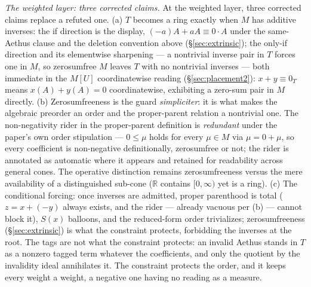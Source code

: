 \textit{The weighted layer: three corrected claims.} At the weighted layer, three corrected claims replace a refuted one. (a) $T$ becomes a ring exactly when $M$ has additive inverses: the if direction is the display, $(-a)A + aA \equiv 0 \cdot A$ under the same-Aethus clause and the deletion convention above (§\ref{sec:extrinsic}); the only-if direction and its elementwise sharpening --- a nontrivial inverse pair in $T$ forces one in $M$, so zerosumfree $M$ leaves $T$ with no nontrivial inverses --- both immediate in the $M[U]$ coordinatewise reading (§\ref{sec:placement2}): $x + y \equiv 0_T$ means $x(A) + y(A) = 0$ coordinatewise, exhibiting a zero-sum pair in $M$ directly. (b) Zerosumfreeness is the guard \emph{simpliciter}: it is what makes the algebraic preorder an order and the proper-parent relation a nontrivial one. The non-negativity rider in the proper-parent definition is \emph{redundant} under the paper's own order stipulation --- $0 \leq \mu$ holds for every $\mu \in M$ via $\mu = 0 + \mu$, so every coefficient is non-negative definitionally, zerosumfree or not; the rider is annotated as automatic where it appears and retained for readability across general cones. The operative distinction remains zerosumfreeness versus the mere availability of a distinguished sub-cone ($\mathbb{R}$ contains $[0, \infty)$ yet is a ring). (c) The conditional forcing: once inverses are admitted, proper parenthood is total ($z = x + (-y)$ always exists, and the rider --- already vacuous per (b) --- cannot block it), $S(x)$ balloons, and the reduced-form order trivializes; zerosumfreeness (§\ref{sec:extrinsic}) is what the constraint protects, forbidding the inverses at the root. The tags are not what the constraint protects: an invalid Aethus stands in $T$ as a nonzero tagged term whatever the coefficients, and only the quotient by the invalidity ideal annihilates it. The constraint protects the order, and it keeps every weight a weight, a negative one having no reading as a measure.
